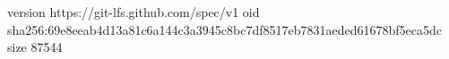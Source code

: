 version https://git-lfs.github.com/spec/v1
oid sha256:69e8eeab4d13a81c6a144c3a3945c8bc7df8517eb7831aeded61678bf5eca5dc
size 87544
